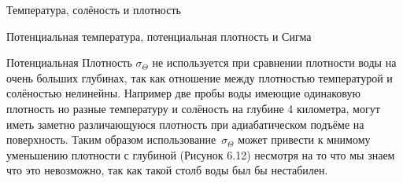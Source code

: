 \begin{chapter}{Температура, солёность и плотность}
\begin{section}{Потенциальная температура, потенциальная плотность и Сигма}
\begin{paragraph}{Потенциальная Плотность}
$\sigma_\Theta$ не используется при сравнении плотности воды на очень
больших глубинах, так как отношение между плотностью температурой и
солёностью нелинейны. Например две пробы воды имеющие одинаковую
плотность но разные температуру и солёность на глубине 4 километра,
могут иметь заметно различающуюся плотность при адиабатическом подъёме
на поверхность. Таким образом использование~$\sigma_\Theta$ может
привести к мнимому уменьшению плотности с глубиной (Рисунок 6.12)
несмотря на то что мы знаем что это невозможно, так как такой столб
воды был бы нестабилен.
%



\end{paragraph}
\end{section}
\end{chapter}
